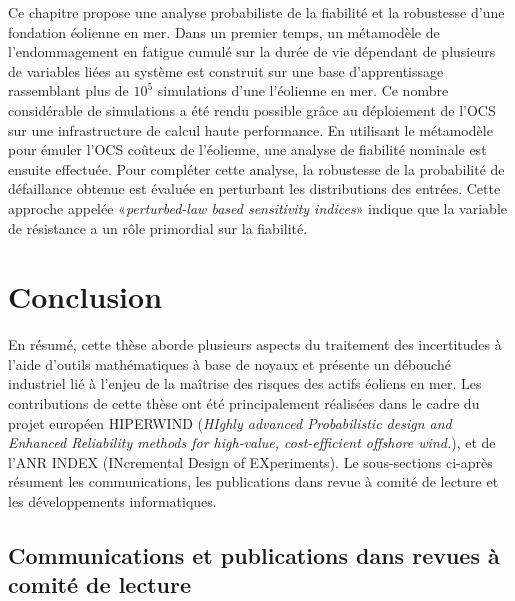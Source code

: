 Ce chapitre propose une analyse probabiliste de la fiabilit\'{e} et la robustesse d'une fondation \'{e}olienne en mer. 
Dans un premier temps, un m\'{e}tamodèle de l'endommagement en fatigue cumul\'{e} sur la dur\'{e}e de vie d\'{e}pendant de plusieurs de variables li\'{e}es au système est construit sur une base d'apprentissage rassemblant plus de $10^5$ simulations d'une l'\'{e}olienne en mer.
Ce nombre consid\'{e}rable de simulations a \'{e}t\'{e} rendu possible grâce au d\'{e}ploiement de l'OCS sur une infrastructure de calcul haute performance. 
En utilisant le m\'{e}tamodèle pour \'{e}muler l'OCS coûteux de l'\'{e}olienne, une analyse de fiabilit\'{e} nominale est ensuite effectu\'{e}e. 
Pour compl\'{e}ter cette analyse, la robustesse de la probabilit\'{e} de d\'{e}faillance obtenue est \'{e}valu\'{e}e en perturbant les distributions des entr\'{e}es. 
Cette approche appel\'{e}e «\textit{perturbed-law based sensitivity indices}» \citep{lemaitre_2015_PLI} indique que la variable de r\'{e}sistance a un rôle primordial sur la fiabilit\'{e}.



\section*{Conclusion}

En r\'{e}sum\'{e}, cette thèse aborde plusieurs aspects du traitement des incertitudes à l'aide d'outils math\'{e}matiques à base de noyaux et pr\'{e}sente un d\'{e}bouch\'{e} industriel li\'{e} à l'enjeu de la maîtrise des risques des actifs \'{e}oliens en mer. 
Les contributions de cette thèse ont \'{e}t\'{e} principalement r\'{e}alis\'{e}es dans le cadre du projet europ\'{e}en HIPERWIND (\textit{HIghly advanced Probabilistic design and Enhanced Reliability methods for high-value, cost-efficient offshore wind.}), et de l'ANR INDEX (INcremental Design of EXperiments). 
Le sous-sections ci-après r\'{e}sument les communications, les publications dans revue à comit\'{e} de lecture et les d\'{e}veloppements informatiques.


\newpage
\subsection*{Communications et publications dans revues à comit\'{e} de lecture}



